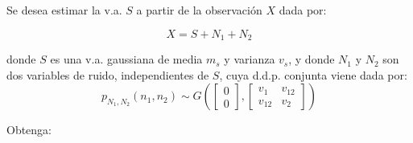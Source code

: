 \ifspanish

\question 
 Se desea estimar la v.a. $S$ a partir de la observación $X$ dada por:

$$X=S+N_1+N_2$$

donde $S$ es una v.a. gaussiana de media $m_s$ y varianza $v_s$, y donde $N_1$ y $N_2$ son dos variables de ruido, independientes de $S$, cuya d.d.p. conjunta viene dada por:
$$
p_{N_1,N_2}\left(n_1,n_2\right) 
	\sim G\left ( \begin{bmatrix} 0 \\ 0 \end{bmatrix},
	              \begin{bmatrix} v_1 & v_{12} \\ v_{12} & v_2 \end{bmatrix}
	      \right)
$$

Obtenga:

